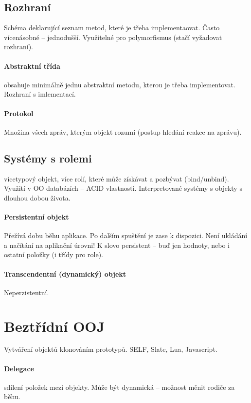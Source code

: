\documentclass[a4wide]{report}
\begin{document}
\subsection{Rozhraní}

Schéma deklarující seznam metod, které je třeba implementaovat. Často vícenásobné -- jednodušší. Využitelné pro polymorfismus (stačí vyžadovat rozhraní).

\paragraph{Abstraktní třída}
obsahuje minimálně jednu abstraktní metodu, kterou je třeba implementovat. Rozhraní s imlementací.

\paragraph{Protokol}
Množina všech zpráv, kterým objekt rozumí (postup hledání reakce na zprávu).

\subsection{Systémy s rolemi}
vícetypový objekt, více rolí, které může získávat a pozbývat (bind/unbind). Využití v OO databázích -- ACID vlastnosti. Interpretované systémy s objekty s dlouhou dobou života.

\paragraph{Persistentní objekt}
Přežívá dobu běhu aplikace. Po dalším spuštění je zase k dispozici. Není ukládání a načítání na aplikační úrovni! K slovo persistent -- buď jen hodnoty, nebo i ostatní položky (i třídy pro role). 

\paragraph{Transcendentní (dynamický) objekt}
Neperzistentní.

\section{Beztřídní OOJ}

Vytváření objektů klonováním prototypů. SELF, Slate, Lua, Javascript.

\paragraph{Delegace} sdílení položek mezi objekty. Může být dynamická -- možnost měnit rodiče za běhu.
\end{document}
